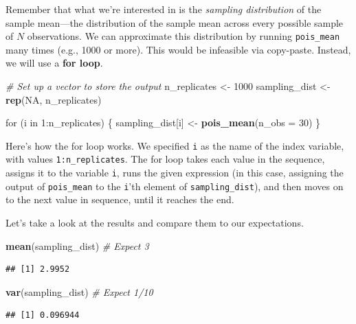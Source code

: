 \documentclass[12pt,oneside,openany]{tufte-book}
\newenvironment{Shaded}{}{}
\newcommand{\KeywordTok}[1]{\textcolor[rgb]{0.00,0.44,0.13}{\textbf{{#1}}}}
\newcommand{\DataTypeTok}[1]{\textcolor[rgb]{0.56,0.13,0.00}{{#1}}}
\newcommand{\DecValTok}[1]{\textcolor[rgb]{0.25,0.63,0.44}{{#1}}}
\newcommand{\StringTok}[1]{\textcolor[rgb]{0.25,0.44,0.63}{{#1}}}
\newcommand{\CommentTok}[1]{\textcolor[rgb]{0.38,0.63,0.69}{\textit{{#1}}}}
\newcommand{\OtherTok}[1]{\textcolor[rgb]{0.00,0.44,0.13}{{#1}}}
\newcommand{\NormalTok}[1]{{#1}}
\begin{document}
Remember that what we're interested in is the \emph{sampling
distribution} of the sample mean---the distribution of the sample mean
across every possible sample of \(N\) observations. We can approximate
this distribution by running \texttt{pois\_mean} many times (e.g., 1000
or more). This would be infeasible via copy-paste. Instead, we will use
a \textbf{for loop}.

\begin{Shaded}
\begin{Highlighting}[]
\CommentTok{# Set up a vector to store the output}
\NormalTok{n_replicates <-}\StringTok{ }\DecValTok{1000}
\NormalTok{sampling_dist <-}\StringTok{ }\KeywordTok{rep}\NormalTok{(}\OtherTok{NA}\NormalTok{, n_replicates)}

\NormalTok{for (i in }\DecValTok{1}\NormalTok{:n_replicates) \{}
    \NormalTok{sampling_dist[i] <-}\StringTok{ }\KeywordTok{pois_mean}\NormalTok{(}\DataTypeTok{n_obs =} \DecValTok{30}\NormalTok{)}
\NormalTok{\}}
\end{Highlighting}
\end{Shaded}

Here's how the for loop works. We specified \texttt{i} as the name of
the index variable, with values \texttt{1:n\_replicates}. The for loop
takes each value in the sequence, assigns it to the variable \texttt{i},
runs the given expression (in this case, assigning the output of
\texttt{pois\_mean} to the \texttt{i}'th element of
\texttt{sampling\_dist}), and then moves on to the next value in
sequence, until it reaches the end.

Let's take a look at the results and compare them to our expectations.

\begin{Shaded}
\begin{Highlighting}[]
\KeywordTok{mean}\NormalTok{(sampling_dist)  }\CommentTok{# Expect 3}
\end{Highlighting}
\end{Shaded}

\begin{verbatim}
## [1] 2.9952
\end{verbatim}

\begin{Shaded}
\begin{Highlighting}[]
\KeywordTok{var}\NormalTok{(sampling_dist)  }\CommentTok{# Expect 1/10}
\end{Highlighting}
\end{Shaded}

\begin{verbatim}
## [1] 0.096944
\end{verbatim}
\end{document}
